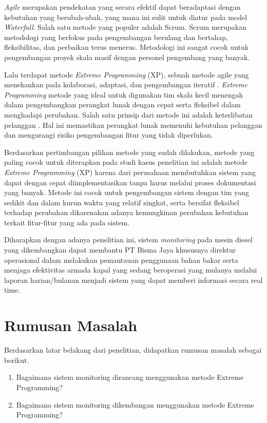 \textit{Agile} merupakan pendekatan yang secara efektif dapat beradaptasi dengan kebutuhan yang berubah-ubah, yang mana ini sulit untuk diatur pada model \textit{Waterfall}. Salah satu metode yang populer adalah Scrum. Scrum merupakan metodologi yang berfokus pada pengembangan berulang dan bertahap, fleksibilitas, dan perbaikan terus menerus. Metodologi ini sangat cocok untuk pengembangan proyek skala masif dengan personel pengembang yang banyak. 

Lalu terdapat metode \textit{Extreme Programming} (XP), sebuah metode agile yang menekankan pada kolaborasi, adaptasi, dan pengembangan iteratif \parencite{article:matharu}. \textit{Extreme Programming} metode yang ideal untuk digunakan tim skala kecil menengah dalam pengembangkan perangkat lunak dengan cepat serta fleksibel dalam menghadapi perubahan. Salah satu prinsip dari metode ini adalah keterlibatan pelanggan \parencite{article:matharu}. Hal ini memastikan perangkat lunak memenuhi kebutuhan pelanggan dan mengurangi risiko pengembangan fitur yang tidak diperlukan.

Berdasarkan pertimbangan pilihan metode yang sudah dilakukan, metode yang paling cocok untuk diterapkan pada studi kasus penelitian ini adalah metode \textit{Extreme Programming} (XP) karena dari perusahaan membutuhkan sistem yang dapat dengan cepat diimplementasikan tanpa harus melalui proses dokumentasi yang banyak. Metode ini cocok untuk pengembangan sistem dengan tim yang sedikit dan dalam kurun waktu yang relatif singkat, serta bersifat fleksibel terhadap perubahan dikarenakan adanya kemungkinan perubahan kebutuhan terkait fitur-fitur yang ada pada sistem. 

Diharapkan dengan adanya penelitian ini, sistem \textit{monitoring} pada mesin diesel yang dikembangkan dapat membantu PT Bisma Jaya khususnya direktur operasional dalam melakukan pemantauan penggunaan bahan bakar serta menjaga efektivitas armada kapal yang sedang beroperasi yang mulanya melalui laporan harian/bulanan menjadi sistem yang dapat memberi informasi secara real time.



\section{Rumusan Masalah}

\noindent Berdasarkan latar belakang dari penelitian, didapatkan rumusan masalah sebagai berikut.

\begin{enumerate}
    \item Bagaimana sistem monitoring dirancang menggunakan metode Extreme Programming?
    \item Bagaimana sistem monitoring dikembangan menggunakan metode Extreme Programming?
\end{enumerate}

